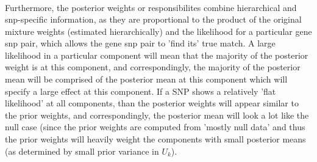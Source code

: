 \documentclass[10pt,letterpaper]{article}
\begin{document}
{\begin{equation}
\begin{aligned}
\end{aligned}
\end{equation}

Furthermore, the posterior weights or responsibilites combine hierarchical and snp-specific information, as they are proportional to the product of the original mixture weights (estimated hierarchically) and the likelihood for a particular gene snp pair, which allows the gene snp pair to 'find its' true match. A large likelihood in a particular component will mean that the majority of the posterior weight is at this component, and correspondingly, the majority of the posterior mean will be comprised of the posterior mean at this component which will specify a large effect at this component. If a SNP shows a relatively 'flat likelihood' at all components, than the posterior weights will appear similar to the prior weights, and correspondingly, the posterior mean will look a lot like the null case (since the prior weights are computed from 'mostly null data' and thus the prior weights will heavily weight the components with small posterior means (as determined by small prior variance in $U_{k}$).

}
\end{document}
